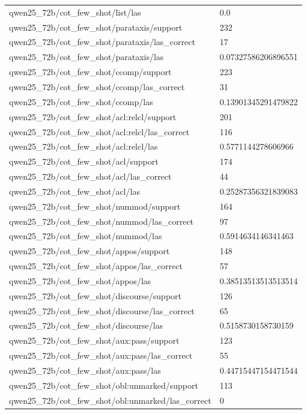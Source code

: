 \begin{tabular}{ll}
qwen25\_72b/cot\_few\_shot/list/las & 0.0 \\
qwen25\_72b/cot\_few\_shot/parataxis/support & 232 \\
qwen25\_72b/cot\_few\_shot/parataxis/las\_correct & 17 \\
qwen25\_72b/cot\_few\_shot/parataxis/las & 0.07327586206896551 \\
qwen25\_72b/cot\_few\_shot/ccomp/support & 223 \\
qwen25\_72b/cot\_few\_shot/ccomp/las\_correct & 31 \\
qwen25\_72b/cot\_few\_shot/ccomp/las & 0.13901345291479822 \\
qwen25\_72b/cot\_few\_shot/acl:relcl/support & 201 \\
qwen25\_72b/cot\_few\_shot/acl:relcl/las\_correct & 116 \\
qwen25\_72b/cot\_few\_shot/acl:relcl/las & 0.5771144278606966 \\
qwen25\_72b/cot\_few\_shot/acl/support & 174 \\
qwen25\_72b/cot\_few\_shot/acl/las\_correct & 44 \\
qwen25\_72b/cot\_few\_shot/acl/las & 0.25287356321839083 \\
qwen25\_72b/cot\_few\_shot/nummod/support & 164 \\
qwen25\_72b/cot\_few\_shot/nummod/las\_correct & 97 \\
qwen25\_72b/cot\_few\_shot/nummod/las & 0.5914634146341463 \\
qwen25\_72b/cot\_few\_shot/appos/support & 148 \\
qwen25\_72b/cot\_few\_shot/appos/las\_correct & 57 \\
qwen25\_72b/cot\_few\_shot/appos/las & 0.38513513513513514 \\
qwen25\_72b/cot\_few\_shot/discourse/support & 126 \\
qwen25\_72b/cot\_few\_shot/discourse/las\_correct & 65 \\
qwen25\_72b/cot\_few\_shot/discourse/las & 0.5158730158730159 \\
qwen25\_72b/cot\_few\_shot/aux:pass/support & 123 \\
qwen25\_72b/cot\_few\_shot/aux:pass/las\_correct & 55 \\
qwen25\_72b/cot\_few\_shot/aux:pass/las & 0.44715447154471544 \\
qwen25\_72b/cot\_few\_shot/obl:unmarked/support & 113 \\
qwen25\_72b/cot\_few\_shot/obl:unmarked/las\_correct & 0 \\

\end{tabular}
